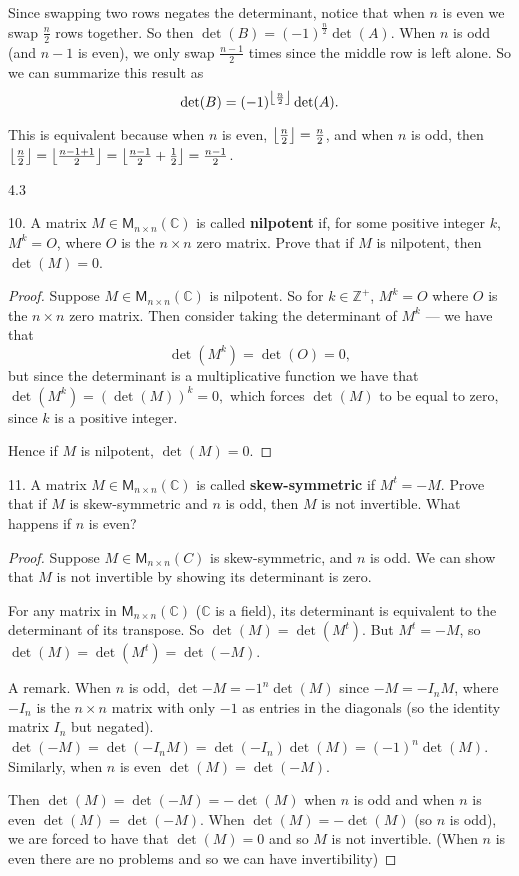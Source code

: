\documentclass[11pt]{article}
\newcommand{\br}[1]{\left(#1\right)}
\DeclarePairedDelimiter\floor{\lfloor}{\rfloor}
\begin{document}
Since swapping two rows negates the determinant, notice that when $n$ is even we swap $\frac{n}{2}$ rows together. So then $\det(B) = (-1)^{\frac{n}{2}}\det(A)$. When $n$ is odd (and $n-1$ is even), we only swap $\frac{n-1}{2}$ times since the middle row is left alone. So we can summarize this result as $$\det(B) = (-1)^{\floor*{\frac{n}{2}}}\det(A).$$

This is equivalent because when $n$ is even, $\floor*{\frac{n}{2}} = \frac{n}{2}$, and when $n$ is odd, then $\floor*{\frac{n}{2}} = \floor*{\frac{n-1 + 1}{2}} = \floor*{\frac{n-1}{2} + \frac{1}{2}} = \frac{n-1}{2}$.

4.3

10. A matrix $M\in\mathsf{M}_{n\times n}(\mathbb{C})$ is called \textbf{nilpotent} if, for some positive integer $k$, $M^k = O$, where $O$ is the $n\times n$ zero matrix. Prove that if $M$ is nilpotent, then $\det(M) = 0$.

\begin{proof}
    Suppose $M\in\mathsf{M}_{n\times n}(\mathbb{C})$ is nilpotent. So for $k\in\mathbb{Z}^{+}$, $M^k = O$ where $O$ is the $n\times n$ zero matrix. Then consider taking the determinant of $M^k$ --- we have that $$\det(M^k) = \det(O) = 0,$$ but since the determinant is a multiplicative function we have that $\det(M^k) = \br{\det(M)}^k = 0,$ which forces $\det(M)$ to be equal to zero, since $k$ is a positive integer.

    Hence if $M$ is nilpotent, $\det(M) = 0$.
\end{proof}

11. A matrix $M\in\mathsf{M}_{n\times n}(\mathbb{C})$ is called \textbf{skew-symmetric} if $M^t = -M$. Prove that if $M$ is skew-symmetric and $n$ is odd, then $M$ is not invertible. What happens if $n$ is even?

\begin{proof}
    Suppose $M\in\mathsf{M}_{n\times n}(C)$ is skew-symmetric, and $n$ is odd. We can show that $M$ is not invertible by showing its determinant is zero.

    For any matrix in $\mathsf{M}_{n\times n}(\mathbb{C})$ ($\mathbb{C}$ is a field), its determinant is equivalent to the determinant of its transpose. So $\det(M) = \det(M^t)$. But $M^t = -M$, so $\det(M) = \det(M^t) = \det(-M)$.

    A remark. When $n$ is odd, $\det{-M} = -1^n\det(M)$ since $-M = -I_n M$, where $-I_n$ is the $n\times n$ matrix with only $-1$ as entries in the diagonals (so the identity matrix $I_n$ but negated). $\det(-M) = \det(-I_n M) = \det(-I_n)\det(M) = (-1)^n\det(M)$. Similarly, when $n$ is even $\det(M) = \det(-M)$.

    Then $\det(M) = \det(-M) = -\det(M)$ when $n$ is odd and when $n$ is even $\det(M) = \det(-M)$. When $\det(M) = -\det(M)$ (so $n$ is odd), we are forced to have that $\det(M) = 0$ and so $M$ is not invertible. (When $n$ is even there are no problems and so we can have invertibility)
\end{proof}
\end{document}
